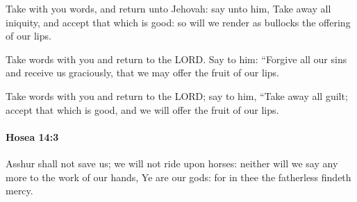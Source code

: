 			\begin{versebox}
					\item[BHS] 
					\item[LXX] 
					\item[ASV] Take with you words, and return unto Jehovah: say unto him, Take away all iniquity, and accept that which is good: so will we render as bullocks the offering of our lips.
					\item[NIV] Take words with you and return to the LORD. Say to him: “Forgive all our sins and receive us graciously, that we may offer the fruit of our lips.
					\item[NRSV] Take words with you and return to the LORD; say to him, “Take away all guilt; accept that which is good, and we will offer the fruit of our lips.
			\end{versebox}

		\paragraph{Hosea 14:3} %
			\label{HOSEA-14-3}

			Asshur shall not save us; we will not ride upon horses: neither will we say any more to the work of our hands, Ye are our gods: for in thee the fatherless findeth mercy.

